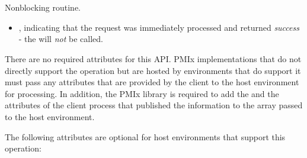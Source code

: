 \section{}


\summary

Nonblocking  routine.

\format


\begin{arglist}
\end{arglist}

\returnsimplenb

\returnstart
\begin{itemize}
    \item {}, indicating that the request was immediately processed and returned \textit{success} - the  will \textit{not} be called.
\end{itemize}
\returnend

\reqattrstart
There are no required attributes for this \ac{API}. \ac{PMIx} implementations that do not directly support the operation but are hosted by environments that do support it must pass any attributes that are provided by the client to the host environment for processing. In addition, the \ac{PMIx} library is required to add the  and the  attributes of the client process that published the information to the  array passed to the host environment.
\reqattrend

\optattrstart
The following attributes are optional for host environments that support this operation:

